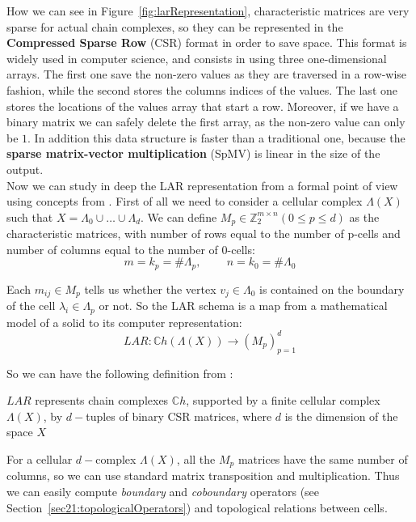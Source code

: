 How we can see in Figure~\ref{fig:larRepresentation}, characteristic matrices are very sparse for actual chain complexes, so they can be represented in the \textbf{Compressed Sparse Row} (CSR) format in order to save space. This format is widely used in computer science, and consists in using three one-dimensional arrays. The first one save the non-zero values as they are traversed in a row-wise fashion, while the second stores the columns indices of the values. The last one stores the locations of the values array that start a row. Moreover, if we have a binary matrix we can safely delete the first array, as the non-zero value can only be $1$. In addition this data structure is faster than a traditional one, because the \textbf{sparse matrix-vector multiplication} (SpMV) is linear in the size of the output.\\

Now we can study in deep the LAR representation from a formal point of view using concepts from \cite{DiCarlo}. First of all we need to consider a cellular complex $\Lambda(X)$ such that $X = \Lambda_{0} \cup \dots \cup \Lambda_{d}$. We can define $M_{p} \in \mathbb{Z}_{2}^{m\times n} (0\leq p \leq d)$ as the characteristic matrices, with number of rows equal to the number of p-cells and number of columns equal to the number of 0-cells:
\begin{equation}
 m = k_{p} = \#\Lambda_{p}, \; \; \; \; \; \; \; \; n = k_{0} = \#\Lambda_{0}
\end{equation}

Each $m_{ij} \in M_{p}$ tells us whether the vertex $v_{j} \in \Lambda_{0}$ is contained on the boundary of the cell $\lambda_{i} \in \Lambda_{p}$ or not. So the LAR schema is a map from a mathematical model of a solid to its computer representation:
\begin{equation}
 LAR \colon \mathbb{C}h(\Lambda(X)) \rightarrow (M_{p})^{d}_{p=1}
\end{equation}

So we can have the following definition from \cite{DiCarlo}:
\begin{definition}
 $LAR$ represents chain complexes $\mathbb{C}h$, supported by a finite cellular complex $\Lambda(X)$, by $d-$tuples of binary CSR matrices, where $d$ is the dimension of the space $X$
\end{definition}

For a cellular $d-$complex $\Lambda(X)$, all the $M_{p}$ matrices have the same number of columns, so we can use standard matrix transposition and multiplication. Thus we can easily compute \textit{boundary} and \textit{coboundary} operators (see Section~\ref{sec21:topologicalOperators}) and topological relations between cells.\\

